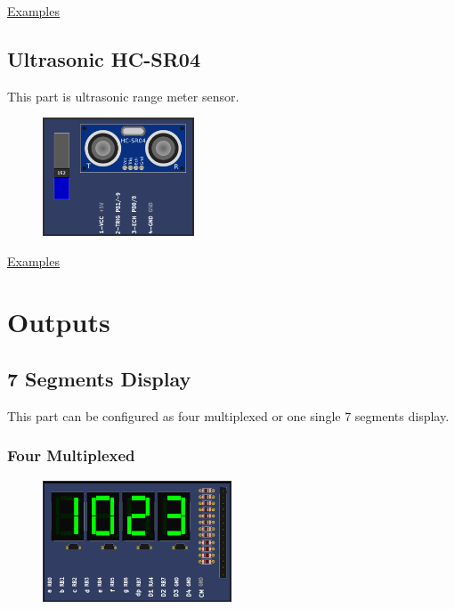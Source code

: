 \href{https://lcgamboa.github.io/picsimlab_examples/parts_Switches.html}{Examples}



\subsection{Ultrasonic HC-SR04}
This part is ultrasonic range meter sensor.

\begin{figure}[H]
\center
\includegraphics[width=0.4\textwidth]{img/part_hcsr04.png} 
\end{figure} 


\href{https://lcgamboa.github.io/picsimlab_examples/parts_Ultrasonic_HC-SR04.html}{Examples}

\vspace{0.5cm}



\section{Outputs}

\subsection{7 Segments Display}

This part can be configured as four multiplexed or one single 7 segments display.

\subsubsection{Four Multiplexed}
\begin{figure}[H]
\center
\includegraphics[width=0.5\textwidth]{img/part_7seg.png} 
\end{figure} 

